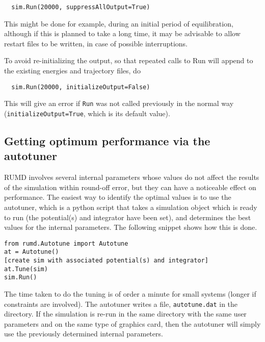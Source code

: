 \begin{verbatim}
  sim.Run(20000, suppressAllOutput=True)
\end{verbatim}
This might be done for example, during an initial period of equilibration, 
although if this is planned to take a long time, it may be advisable to allow
restart files to be written, in case of possible interruptions.

To avoid re-initializing the output, so that repeated calls to Run will 
append to the existing energies and trajectory files, do

\begin{verbatim}
  sim.Run(20000, initializeOutput=False)
\end{verbatim}
This will give an error if \verb|Run| was not called previously in the normal
way (\verb|initializeOutput=True|, which is its default value).


\subsection{Getting optimum performance via the autotuner}

RUMD involves several internal parameters whose values do not affect the 
results of the simulation within round-off
error, but they can have a noticeable effect on performance. The easiest way
to identify the optimal values is to use the autotuner, which is a python
script that takes a simulation object which is ready to run (the potential(s)
and integrator have been set), and determines the best values for the internal
parameters. The following snippet shows how this is done.

\begin{verbatim}
from rumd.Autotune import Autotune
at = Autotune()
[create sim with associated potential(s) and integrator]
at.Tune(sim)
sim.Run()
\end{verbatim}

The time taken to do the tuning is of order a minute for small systems
(longer if constraints are involved). The autotuner writes a file,
\verb|autotune.dat| in the directory. If the simulation is re-run in the same
directory with the same user parameters and on the same type of graphics card, 
then the autotuner will simply use the previously determined internal 
parameters.

\clearpage

%
